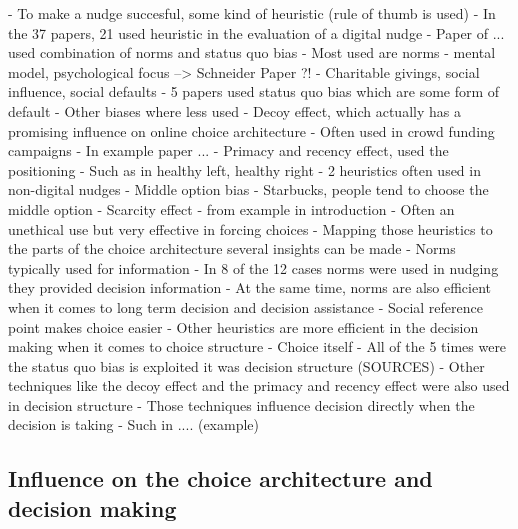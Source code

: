 - To make a nudge succesful, some kind of heuristic (rule of thumb is used) \cite{thaler_nudge:_2009}
- In the 37 papers, 21 used heuristic in the evaluation of a digital nudge 
- Paper of ... used combination of norms and status quo bias
- Most used are norms - mental model, psychological focus --> Schneider Paper ?!
- Charitable givings, social influence, social defaults
- 5 papers used status quo bias which are some form of default
- Other biases where less used
- Decoy effect, which actually has a promising influence on online choice architecture
- Often used in crowd funding campaigns
- In example paper ...
- Primacy and recency effect, used the positioning
- Such as in healthy left, healthy right
- 2 heuristics often used in non-digital nudges
- Middle option bias - Starbucks, people tend to choose the middle option
- Scarcity effect - from example in introduction
- Often an unethical use \cite{sunstein_nudging_2015} but very effective in forcing choices
- Mapping those heuristics to the parts of the choice architecture several insights can be made
- Norms typically used for information
- In 8 of the 12 cases norms were used in nudging they provided decision information
- At the same time, norms are also efficient when it comes to long term decision and decision assistance
- Social reference point makes choice easier
- Other heuristics are more efficient in the decision making when it comes to choice structure
- Choice itself
- All of the 5 times were the status quo bias is exploited it was decision structure (SOURCES)
- Other techniques like the decoy effect and the primacy and recency effect were also used in decision structure
- Those techniques influence decision directly when the decision is taking
- Such in .... (example)


\subsection{Influence on the choice architecture and decision making}


